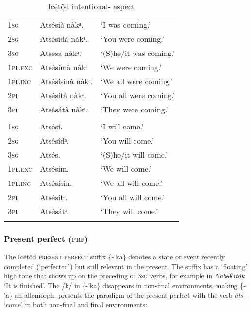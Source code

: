 \begin{table}
\caption{Icétôd intentional- aspect}
\label{tab:verbs:int}


\begin{tabularx}{\textwidth}{XXX}
\lsptoprule

\multicolumn{2}{X}{Imperfective} & \\
\midrule
\textsc{1sg} & Atsésíà nàkᵃ. & ‘I was coming.’\\
\textsc{2sg} & Atsésídà nàkᵃ. & ‘You were coming.’\\
\textsc{3sg} & Atsesa nákᵃ. & ‘(S)he/it was coming.’\\
\textsc{1pl.exc} & Atsésímà nàkᵃ & ‘We were coming.’\\
\textsc{1pl.inc} & Atsésísìnà nàkᵃ. & ‘We all were coming.’\\
\textsc{2pl} & Atsésítà nàkᵃ. & ‘You all were coming.’\\
\textsc{3pl} & Atsésátà nàkᵃ. & ‘They were coming.’\\
\tablevspace
\multicolumn{2}{X}{Intentional} & \\
\midrule
\textsc{1sg} & Atsésí. & ‘I will come.’\\
\textsc{2sg} & Atsésîdᵃ. & ‘You will come.’\\
\textsc{3sg} & Atsés. & ‘(S)he/it will come.’\\
\textsc{1pl.exc} & Atsésím. & ‘We will come.’\\
\textsc{1pl.inc} & Atsésísìn. & ‘We all will come.’\\
\textsc{2pl} & Atsésítᵃ. & ‘You all will come.’\\
\textsc{3pl} & Atsésátᵃ. & ‘They will come.’\\
\lspbottomrule
\end{tabularx}
\end{table}

\subsubsection{Present perfect (\textsc{prf})}\label{sec:8.10.2}

The Icétôd \textsc{present perfect} suffix \{-\'{}ka\} denotes a state or event recently completed (‘perfected’) but still relevant in the present. The suffix has a ‘floating’ high tone that shows up on the preceding  of 3\textsc{sg} verbs, for example in \textit{Nabʉƙɔták\ᵃ} ‘It is finished’. The /k/ in \{-\'{}ka\} disappears in non-final environments, making \{-\'{}a\} an allomorph.  presents the paradigm of the present perfect with the verb \textit{àts-} ‘come’ in both non-final and final environments:


